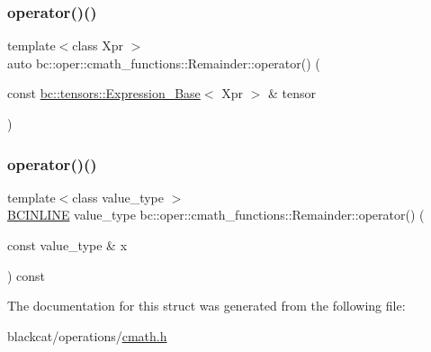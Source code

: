 \mbox{\label{structbc_1_1oper_1_1cmath__functions_1_1Remainder_af444454bd3404384caefd62cae8b8958}} 
\subsubsection{\texorpdfstring{operator()()}{operator()()}\hspace{0.1cm}{\footnotesize\ttfamily [2/3]}}
{\footnotesize\ttfamily template$<$class Xpr $>$ \\
auto bc\+::oper\+::cmath\+\_\+functions\+::\+Remainder\+::operator() (\begin{DoxyParamCaption}\item[{const \hyperlink{classbc_1_1tensors_1_1Expression__Base}{bc\+::tensors\+::\+Expression\+\_\+\+Base}$<$ Xpr $>$ \&}]{tensor }\end{DoxyParamCaption})\hspace{0.3cm}{\ttfamily [inline]}}

\mbox{\label{structbc_1_1oper_1_1cmath__functions_1_1Remainder_a6e3226f6e49bc27fe45dfe6337a80294}} 
\subsubsection{\texorpdfstring{operator()()}{operator()()}\hspace{0.1cm}{\footnotesize\ttfamily [3/3]}}
{\footnotesize\ttfamily template$<$class value\+\_\+type $>$ \\
\hyperlink{common_8h_a6699e8b0449da5c0fafb878e59c1d4b1}{B\+C\+I\+N\+L\+I\+NE} value\+\_\+type bc\+::oper\+::cmath\+\_\+functions\+::\+Remainder\+::operator() (\begin{DoxyParamCaption}\item[{const value\+\_\+type \&}]{x }\end{DoxyParamCaption}) const\hspace{0.3cm}{\ttfamily [inline]}}



The documentation for this struct was generated from the following file\+:\begin{DoxyCompactItemize}
\item 
blackcat/operations/\hyperlink{cmath_8h}{cmath.\+h}\end{DoxyCompactItemize}
